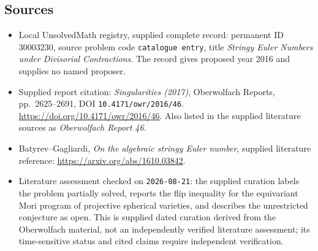 \documentclass[11pt]{article}
\begin{document}
\subsection{Sources}
\begin{itemize}
\item Local UnsolvedMath registry, supplied complete record: permanent ID \(30003230\), source problem code \texttt{catalogue entry}, title \emph{Stringy Euler Numbers under Divisorial Contractions}. The record gives proposed year 2016 and supplies no named proposer.
\item Supplied report citation: \emph{Singularities (2017)}, Oberwolfach Reports, pp.\ 2625--2691, DOI \texttt{10.4171/owr/2016/46}. \url{https://doi.org/10.4171/owr/2016/46}. Also listed in the supplied literature sources as \emph{Oberwolfach Report 46}.
\item Batyrev--Gagliardi, \emph{On the algebraic stringy Euler number}, supplied literature reference: \url{https://arxiv.org/abs/1610.03842}.
\item Literature assessment checked on \texttt{2026-08-21}: the supplied curation labels the problem partially solved, reports the flip inequality for the equivariant Mori program of projective spherical varieties, and describes the unrestricted conjecture as open. This is supplied dated curation derived from the Oberwolfach material, not an independently verified literature assessment; its time-sensitive status and cited claims require independent verification.
\end{itemize}
\end{document}
